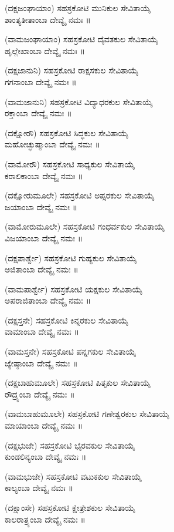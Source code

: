 (ದಕ್ಷಜಂಘಾಯಾಂ) ಸಹಸ್ರಕೋಟಿ ಮುನಿಕುಲ ಸೇವಿತಾಯೈ\\ ಶಾಂತ್ಯತೀತಾಂಬಾ ದೇವ್ಯೈ ನಮಃ ॥

(ವಾಮಜಂಘಾಯಾಂ) ಸಹಸ್ರಕೋಟಿ ದೈವತಕುಲ ಸೇವಿತಾಯೈ\\ ಹೃಲ್ಲೇಖಾಂಬಾ ದೇವ್ಯೈ ನಮಃ ॥

(ದಕ್ಷಜಾನುನಿ) ಸಹಸ್ರಕೋಟಿ ರಾಕ್ಷಸಕುಲ ಸೇವಿತಾಯೈ\\ ಗಗನಾಂಬಾ ದೇವ್ಯೈ ನಮಃ ॥

(ವಾಮಜಾನುನಿ) ಸಹಸ್ರಕೋಟಿ ವಿದ್ಯಾಧರಕುಲ ಸೇವಿತಾಯೈ\\ ರಕ್ತಾಂಬಾ ದೇವ್ಯೈ ನಮಃ ॥

(ದಕ್ಷೋರೌ) ಸಹಸ್ರಕೋಟಿ ಸಿದ್ಧಕುಲ ಸೇವಿತಾಯೈ\\ ಮಹೋಚ್ಛುಷ್ಮಾಂಬಾ ದೇವ್ಯೈ ನಮಃ ॥

(ವಾಮೋರೌ) ಸಹಸ್ರಕೋಟಿ ಸಾಧ್ಯಕುಲ ಸೇವಿತಾಯೈ\\ ಕರಾಲಿಕಾಂಬಾ ದೇವ್ಯೈ ನಮಃ ॥

(ದಕ್ಷೋರುಮೂಲೇ) ಸಹಸ್ರಕೋಟಿ ಅಪ್ಸರಕುಲ ಸೇವಿತಾಯೈ\\ ಜಯಾಂಬಾ ದೇವ್ಯೈ ನಮಃ ॥

(ವಾಮೋರುಮೂಲೇ) ಸಹಸ್ರಕೋಟಿ ಗಂಧರ್ವಕುಲ ಸೇವಿತಾಯೈ\\ ವಿಜಯಾಂಬಾ ದೇವ್ಯೈ ನಮಃ ॥

(ದಕ್ಷಪಾರ್ಶ್ವೇ) ಸಹಸ್ರಕೋಟಿ ಗುಹ್ಯಕುಲ ಸೇವಿತಾಯೈ\\ ಅಜಿತಾಂಬಾ ದೇವ್ಯೈ ನಮಃ ॥

(ವಾಮಪಾರ್ಶ್ವೇ) ಸಹಸ್ರಕೋಟಿ ಯಕ್ಷಕುಲ ಸೇವಿತಾಯೈ\\ ಅಪರಾಜಿತಾಂಬಾ ದೇವ್ಯೈ ನಮಃ ॥

(ದಕ್ಷಸ್ತನೇ) ಸಹಸ್ರಕೋಟಿ ಕಿನ್ನರಕುಲ ಸೇವಿತಾಯೈ\\ ವಾಮಾಂಬಾ ದೇವ್ಯೈ ನಮಃ ॥

(ವಾಮಸ್ತನೇ) ಸಹಸ್ರಕೋಟಿ ಪನ್ನಗಕುಲ ಸೇವಿತಾಯೈ\\ ಜ್ಯೇಷ್ಠಾಂಬಾ ದೇವ್ಯೈ ನಮಃ ॥

(ದಕ್ಷಬಾಹುಮೂಲೇ) ಸಹಸ್ರಕೋಟಿ ಪಿತೃಕುಲ ಸೇವಿತಾಯೈ\\ ರೌದ್ರ್ಯಂಬಾ ದೇವ್ಯೈ ನಮಃ ॥

(ವಾಮಬಾಹುಮೂಲೇ) ಸಹಸ್ರಕೋಟಿ ಗಣೇಶ್ವರಕುಲ ಸೇವಿತಾಯೈ\\ ಮಾಯಾಂಬಾ ದೇವ್ಯೈ ನಮಃ ॥

(ದಕ್ಷಭುಜೇ) ಸಹಸ್ರಕೋಟಿ ಭೈರವಕುಲ ಸೇವಿತಾಯೈ\\ ಕುಂಡಲಿನ್ಯಂಬಾ ದೇವ್ಯೈ ನಮಃ ॥

(ವಾಮಭುಜೇ) ಸಹಸ್ರಕೋಟಿ ವಟುಕಕುಲ ಸೇವಿತಾಯೈ\\ ಕಾಲ್ಯಂಬಾ ದೇವ್ಯೈ ನಮಃ ॥

(ದಕ್ಷಾಂಸೇ) ಸಹಸ್ರಕೋಟಿ ಕ್ಷೇತ್ರೇಶಕುಲ ಸೇವಿತಾಯೈ\\ ಕಾಲರಾತ್ರ್ಯಂಬಾ ದೇವ್ಯೈ ನಮಃ ॥


